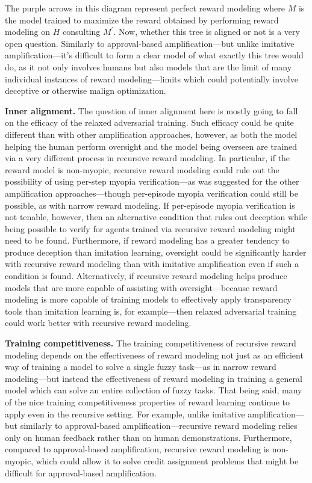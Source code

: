 The purple arrows in this diagram represent perfect reward modeling where $M$ is the model trained to maximize the reward obtained by performing reward modeling on $H$ consulting $M^\prime$. Now, whether this tree is aligned or not is a very open question. Similarly to approval-based amplification---but unlike imitative amplification---it's difficult to form a clear model of what exactly this tree would do, as it not only involves humans but also models that are the limit of many individual instances of reward modeling---limits which could potentially involve deceptive or otherwise malign optimization.

\textbf{Inner alignment.} The question of inner alignment here is mostly going to fall on the efficacy of the relaxed adversarial training. Such efficacy could be quite different than with other amplification approaches, however, as both the model helping the human perform oversight and the model being overseen are trained via a very different process in recursive reward modeling. In particular, if the reward model is non-myopic, recursive reward modeling could rule out the possibility of using per-step myopia verification\cite{TODO: cite https://www.alignmentforum.org/posts/BKM8uQS6QdJPZLqCr/towards-a-mechanistic-understanding-of-corrigibility}---as was suggested for the other amplification approaches---though per-episode myopia verification could still be possible, as with narrow reward modeling. If per-episode myopia verification is not tenable, however, then an alternative condition that rules out deception while being possible to verify for agents trained via recursive reward modeling might need to be found. Furthermore, if reward modeling has a greater tendency to produce deception than imitation learning, oversight could be significantly harder with recursive reward modeling than with imitative amplification even if such a condition is found. Alternatively, if recursive reward modeling helps produce models that are more capable of assisting with oversight---because reward modeling is more capable of training models to effectively apply transparency tools than imitation learning is, for example---then relaxed adversarial training could work better with recursive reward modeling.

\textbf{Training competitiveness.} The training competitiveness of recursive reward modeling depends on the effectiveness of reward modeling not just as an efficient way of training a model to solve a single fuzzy task---as in narrow reward modeling---but instead the effectiveness of reward modeling in training a general model which can solve an entire collection of fuzzy tasks. That being said, many of the nice training competitiveness properties of reward learning continue to apply even in the recursive setting. For example, unlike imitative amplification---but similarly to approval-based amplification---recursive reward modeling relies only on human feedback rather than on human demonstrations. Furthermore, compared to approval-based amplification, recursive reward modeling is non-myopic, which could allow it to solve credit assignment problems that might be difficult for approval-based amplification.

